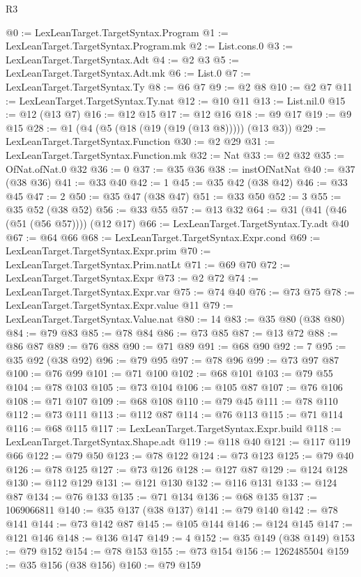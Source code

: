 \begin{lexlean}{R3}
\begin{coremodule}
@0 := LexLeanTarget.TargetSyntax.Program
@1 := LexLeanTarget.TargetSyntax.Program.mk
@2 := List.cons.{0}
@3 := LexLeanTarget.TargetSyntax.Adt
@4 := @2 @3
@5 := LexLeanTarget.TargetSyntax.Adt.mk
@6 := List.{0}
@7 := LexLeanTarget.TargetSyntax.Ty
@8 := @6 @7
@9 := @2 @8
@10 := @2 @7
@11 := LexLeanTarget.TargetSyntax.Ty.nat
@12 := @10 @11
@13 := List.nil.{0}
@15 := @12 (@13 @7)
@16 := @12 @15
@17 := @12 @16
@18 := @9 @17
@19 := @9 @15
@28 := @1 (@4 (@5 (@18 (@19 (@19 (@13 @8))))) (@13 @3))
@29 := LexLeanTarget.TargetSyntax.Function
@30 := @2 @29
@31 := LexLeanTarget.TargetSyntax.Function.mk
@32 := Nat
@33 := @2 @32
@35 := OfNat.ofNat.{0} @32
@36 := 0
@37 := @35 @36
@38 := instOfNatNat
@40 := @37 (@38 @36)
@41 := @33 @40
@42 := 1
@45 := @35 @42 (@38 @42)
@46 := @33 @45
@47 := 2
@50 := @35 @47 (@38 @47)
@51 := @33 @50
@52 := 3
@55 := @35 @52 (@38 @52)
@56 := @33 @55
@57 := @13 @32
@64 := @31 (@41 (@46 (@51 (@56 @57)))) (@12 @17)
@66 := LexLeanTarget.TargetSyntax.Ty.adt @40
@67 := @64 @66
@68 := LexLeanTarget.TargetSyntax.Expr.cond
@69 := LexLeanTarget.TargetSyntax.Expr.prim
@70 := LexLeanTarget.TargetSyntax.Prim.natLt
@71 := @69 @70
@72 := LexLeanTarget.TargetSyntax.Expr
@73 := @2 @72
@74 := LexLeanTarget.TargetSyntax.Expr.var
@75 := @74 @40
@76 := @73 @75
@78 := LexLeanTarget.TargetSyntax.Expr.value @11
@79 := LexLeanTarget.TargetSyntax.Value.nat
@80 := 14
@83 := @35 @80 (@38 @80)
@84 := @79 @83
@85 := @78 @84
@86 := @73 @85
@87 := @13 @72
@88 := @86 @87
@89 := @76 @88
@90 := @71 @89
@91 := @68 @90
@92 := 7
@95 := @35 @92 (@38 @92)
@96 := @79 @95
@97 := @78 @96
@99 := @73 @97 @87
@100 := @76 @99
@101 := @71 @100
@102 := @68 @101
@103 := @79 @55
@104 := @78 @103
@105 := @73 @104
@106 := @105 @87
@107 := @76 @106
@108 := @71 @107
@109 := @68 @108
@110 := @79 @45
@111 := @78 @110
@112 := @73 @111
@113 := @112 @87
@114 := @76 @113
@115 := @71 @114
@116 := @68 @115
@117 := LexLeanTarget.TargetSyntax.Expr.build
@118 := LexLeanTarget.TargetSyntax.Shape.adt
@119 := @118 @40
@121 := @117 @119 @66
@122 := @79 @50
@123 := @78 @122
@124 := @73 @123
@125 := @79 @40
@126 := @78 @125
@127 := @73 @126
@128 := @127 @87
@129 := @124 @128
@130 := @112 @129
@131 := @121 @130
@132 := @116 @131
@133 := @124 @87
@134 := @76 @133
@135 := @71 @134
@136 := @68 @135
@137 := 1069066811
@140 := @35 @137 (@38 @137)
@141 := @79 @140
@142 := @78 @141
@144 := @73 @142 @87
@145 := @105 @144
@146 := @124 @145
@147 := @121 @146
@148 := @136 @147
@149 := 4
@152 := @35 @149 (@38 @149)
@153 := @79 @152
@154 := @78 @153
@155 := @73 @154
@156 := 1262485504
@159 := @35 @156 (@38 @156)
@160 := @79 @159

\end{coremodule}
\end{lexlean}
